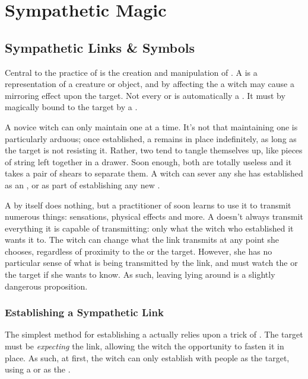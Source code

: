 \chapter{Sympathetic Magic}

\section{Sympathetic Links \& Symbols}

Central to the practice of  is the creation and manipulation of {\symbols}.
A {\symbol} is a representation of a creature or object, and by affecting the {\symbol} a witch may cause a mirroring effect upon the target.
Not every  or  is automatically a {\symbol}.
It must by magically bound to the target by a {\symlink}.

A novice witch can only maintain one {\symlink} at a time.
It's not that maintaining one is particularly arduous; once established, a {\symlink} remains in place indefinitely, as long as the target is not resisting it.
Rather, two {\symlinks} tend to tangle themselves up, like pieces of string left together in a drawer.
Soon enough, both are totally useless and it takes a pair of shears to separate them.
A witch can sever any {\symlink} she has established as an {\action}, or as part of establishing any new {\symlink}.

A {\symlink} by itself does nothing, but a practitioner of  soon learns to use it to transmit numerous things: sensations, physical effects and more.
A {\symlink} doesn't always transmit everything it is capable of transmitting: only what the witch who established it wants it to.
The witch can change what the link transmits at any point she chooses, regardless of proximity to the {\symbol} or the target.
However, she has no particular sense of what is being transmitted by the link, and must watch the {\symbol} or the target if she wants to know.
As such, leaving {\symbols} lying around is a slightly dangerous proposition.

\subsection{Establishing a Sympathetic Link}

The simplest method for establishing a {\symlink} actually relies upon a trick of .
The target must be \emph{expecting} the link, allowing the witch the opportunity to fasten it in place.
As such, at first, the witch can only establish {\symlinks} with people as the target, using a  or  as the {\symbol}.


